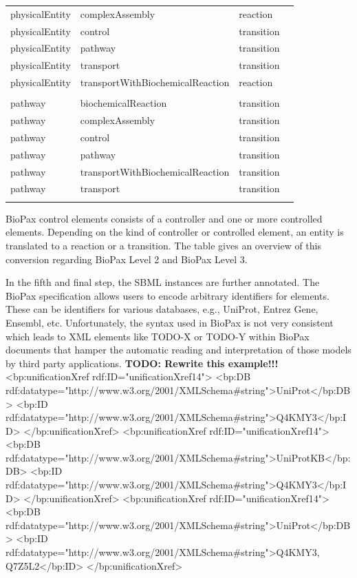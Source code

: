 \documentclass{bioinfo}
\begin{document}
\begin{methods}
\begin{table}[t!h]
{\begin{tabular}{llll}
physicalEntity & complexAssembly                    & reaction\\
physicalEntity & control                            & transition\\
physicalEntity & pathway                            & transition\\
physicalEntity & transport                          & transition\\
physicalEntity & transportWithBiochemicalReaction   & reaction\\
\\
pathway         & biochemicalReaction               & transition\\
pathway         & complexAssembly                   & transition\\
pathway         & control                           & transition\\
pathway         & pathway                           & transition\\
pathway         & transportWithBiochemicalReaction  & transition\\
pathway         & transport                         & transition\\\botrule
\end{tabular}}{BioPax control elements consists of a controller and one or more controlled elements.
Depending on the kind of controller or controlled element, an entity is translated to a reaction or a transition.
The table gives an overview of this conversion regarding BioPax Level 2 and BioPax Level 3.}
\end{table}

In the fifth and final step, the SBML instances are further annotated.
The BioPax specification allows users to encode arbitrary identifiers for elements.
These can be identifiers for various databases, e.g., UniProt, Entrez Gene, Ensembl, etc. Unfortunately, the syntax used in BioPax is not very consistent which leads to XML elements like TODO-X or TODO-Y within BioPax documents that hamper the automatic reading and interpretation of those models by third party applications.
\textbf{TODO: Rewrite this example!!!}
  <bp:unificationXref rdf:ID="unificationXref14">
    <bp:DB rdf:datatype="http://www.w3.org/2001/XMLSchema\#string">UniProt</bp:DB>
    <bp:ID rdf:datatype="http://www.w3.org/2001/XMLSchema\#string">Q4KMY3</bp:ID>
  </bp:unificationXref>
  <bp:unificationXref rdf:ID="unificationXref14">
    <bp:DB rdf:datatype="http://www.w3.org/2001/XMLSchema\#string">UniProtKB</bp:DB>
    <bp:ID rdf:datatype="http://www.w3.org/2001/XMLSchema\#string">Q4KMY3</bp:ID>
  </bp:unificationXref>
  <bp:unificationXref rdf:ID="unificationXref14">
    <bp:DB rdf:datatype="http://www.w3.org/2001/XMLSchema\#string">UniProt</bp:DB>
    <bp:ID rdf:datatype="http://www.w3.org/2001/XMLSchema\#string">Q4KMY3, Q7Z5L2</bp:ID>
  </bp:unificationXref>


\end{methods}
\end{document}
